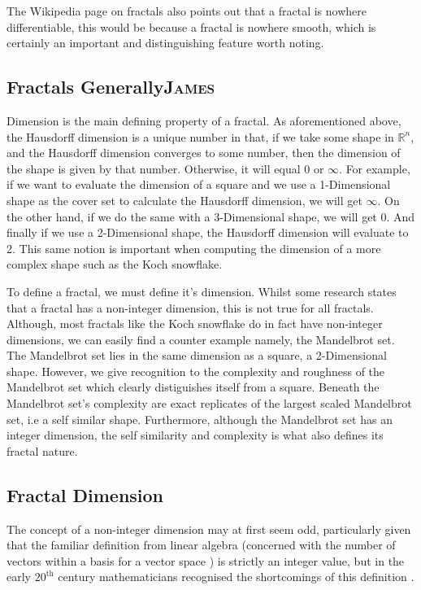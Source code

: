\documentclass[a4paper,11pt,twoside]{article}
\begin{document}
The Wikipedia page on fractals \cite{Fractal2020} also points out that a
fractal is nowhere differentiable, this would be because a fractal is
nowhere smooth, which is certainly an important and distinguishing feature worth noting.

\subsection{Fractals Generally\hfill{}\textsc{James}}
\label{sec:org8199e01}
Dimension is the main defining property of a fractal. As aforementioned above, the Hausdorff dimension is a unique number in that, if we take some shape in \(\mathbb{R}^{n}\), and the Hausdorff dimension converges to some number, then the dimension of the shape is given by that number. Otherwise, it will equal \(0\) or \(\infty\). For example, if we want to evaluate the dimension of a square and we use a 1-Dimensional shape as the cover set to calculate the Hausdorff dimension, we will get \(\infty\). On the other hand, if we do the same with a 3-Dimensional shape, we will get 0. And finally if we use a 2-Dimensional shape, the Hausdorff dimension will evaluate to 2. This same notion is important when computing the dimension of a more complex shape such as the Koch snowflake.

To define a fractal, we must define it's dimension. Whilst some research states that a fractal has a non-integer dimension, this is not true for all fractals. Although, most fractals like the Koch snowflake do in fact have non-integer dimensions, we can easily find a counter example namely, the Mandelbrot set. The Mandelbrot set lies in the same dimension as a square, a 2-Dimensional shape. However, we give recognition to the complexity and roughness of the Mandelbrot set which clearly distiguishes itself from a square. Beneath the Mandelbrot set's complexity are exact replicates of the largest scaled Mandelbrot set, i.e a self similar shape. Furthermore, although the Mandelbrot set has an integer dimension, the self similarity and complexity is what also defines its fractal nature.

\subsection{Fractal Dimension}
\label{sec:org84c1f4d}
The concept of a non-integer dimension may at first seem odd, particularly given that the familiar definition from linear algebra (concerned with the number of vectors within a basis for a vector space \cite{larsonElementaryLinearAlgebra1991}) is strictly an integer value, but in the early \(20^{\mathrm{th}}\) century mathematicians recognised the shortcomings of this definition \cite[Ch. 3]{mandelbrotFractalGeometryNature1982}.
\end{document}
